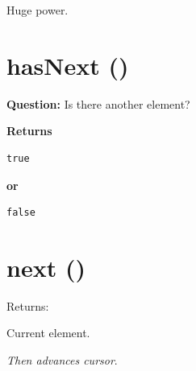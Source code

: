 \documentclass[11pt,a4paper]{book}
\newcommand{\question}[1]{
\vspace{0.5em}
\textbf{Question:} #1?
\vspace{0.2em}
}
\begin{document}
Huge power.






\section{hasNext ()}

\question{Is there another element}

\medskip

\textcolor{RosettaBlue}{\textbf{Returns}}

\begin{center}

\begin{verbatim}
true
\end{verbatim}

\textcolor{RosettaGray}{\textbf{or}}

\begin{verbatim}
false
\end{verbatim}

\end{center}

\section{next ()}

Returns:


Current element.


\emph{Then advances \textcolor{RosettaRoyalPurple}{cursor}}.

\end{document}
